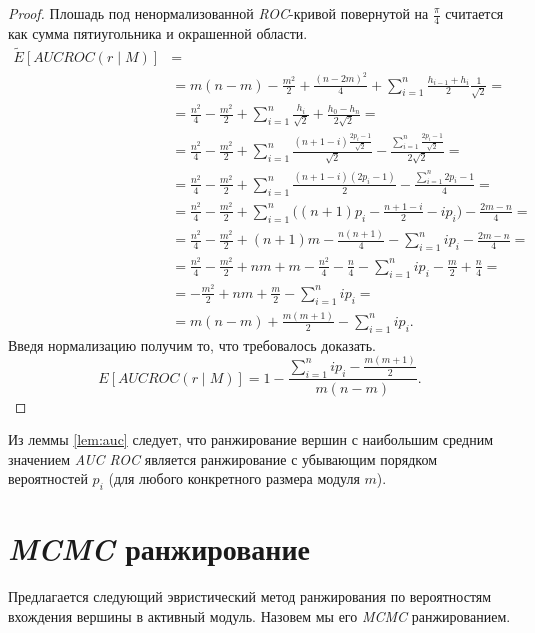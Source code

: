 \begin{proof}
    Плошадь под ненормализованной \emph{ROC}-кривой  повернутой на
    $\frac{\pi}{4}$ считается как сумма пятиугольника и окрашенной области.
    \begin{align*}
        \tilde{E}[AUC ROC(r \mid M)] &=\\
        &= m(n-m) - \frac{m^2}{2}+\frac{(n-2m)^2}{4} + 
            \sum_{i=1}^{n} \frac{h_{i-1}+h_{i}}{2}\frac{1}{\sqrt{2}} = \\
        &= \frac{n^2}{4} - \frac{m^2}{2} +
            \sum_{i=1}^{n} \frac{h_i}{\sqrt{2}} + \frac{h_0 - h_n}{2\sqrt{2}} = \\
        &= \frac{n^2}{4} - \frac{m^2}{2} +
            \sum_{i=1}^{n} \frac{(n+1-i)\frac{2p_i-1}{\sqrt{2}}}{\sqrt{2}} - \frac{\sum_{i=1}^{n} \frac{2p_i-1}{\sqrt{2}}}{2\sqrt{2}} = \\
        &= \frac{n^2}{4} - \frac{m^2}{2} +
            \sum_{i=1}^{n} \frac{(n+1-i)(2p_i-1)}{2} - \frac{\sum_{i=1}^{n} 2p_i-1}{4} = \\
        &= \frac{n^2}{4} - \frac{m^2}{2} +
            \sum_{i=1}^{n} \bigg((n+1)p_i - \frac{n+1-i}{2} -ip_i\bigg)- \frac{2m-n}{4} = \\
        &= \frac{n^2}{4} - \frac{m^2}{2} +
            (n+1)m - \frac{n(n+1)}{4} - \sum_{i=1}^{n}ip_i -\frac{2m-n}{4} = \\
        &= \frac{n^2}{4} - \frac{m^2}{2} +
            nm + m - \frac{n^2}{4} - \frac{n}{4} - \sum_{i=1}^{n}ip_i -\frac{m}{2} + \frac{n}{4} = \\
        &=  - \frac{m^2}{2} +
            nm + \frac{m}{2} - \sum_{i=1}^{n}ip_i = \\
        &=  m(n-m) + \frac{m(m+1)}{2} - \sum_{i=1}^{n}ip_i.
    \end{align*}
    Введя нормализацию получим то, что требовалось доказать.
    \[E[AUC ROC(r \mid M)] = 1 - \frac{\sum_{i=1}^{n}ip_i - \frac{m(m+1)}{2}}{m(n-m)}.\]
\end{proof}

Из леммы \ref{lem:auc} следует, что ранжирование вершин с наибольшим средним
значением \emph{AUC ROC} является ранжирование с убывающим порядком
вероятностей $p_i$ (для любого конкретного размера модуля $m$).





\section{\emph{MCMC} ранжирование}
Предлагается следующий эвристический метод ранжирования по вероятностям
вхождения вершины в активный модуль. Назовем мы его \emph{MCMC} ранжированием.

